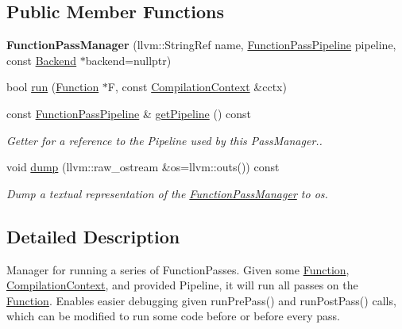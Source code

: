 \subsection*{Public Member Functions}
\begin{DoxyCompactItemize}
\item 
\mbox{\label{classglow_1_1_function_pass_manager_aacb987bbb3ae15f4afc84a4bcb23fb42}} 
{\bfseries Function\+Pass\+Manager} (llvm\+::\+String\+Ref name, \hyperlink{classglow_1_1_function_pass_pipeline}{Function\+Pass\+Pipeline} pipeline, const \hyperlink{classglow_1_1_backend}{Backend} $\ast$backend=nullptr)
\item 
bool \hyperlink{classglow_1_1_function_pass_manager_ac2c8fd23e1415a40177ec7e0cadd5930}{run} (\hyperlink{classglow_1_1_function}{Function} $\ast$F, const \hyperlink{structglow_1_1_compilation_context}{Compilation\+Context} \&cctx)
\item 
\mbox{\label{classglow_1_1_function_pass_manager_a8771d26bc6f66bf8163e1397d250d601}} 
const \hyperlink{classglow_1_1_function_pass_pipeline}{Function\+Pass\+Pipeline} \& \hyperlink{classglow_1_1_function_pass_manager_a8771d26bc6f66bf8163e1397d250d601}{get\+Pipeline} () const
\begin{DoxyCompactList}\small\item\em Getter for a reference to the Pipeline used by this Pass\+Manager.. \end{DoxyCompactList}\item 
\mbox{\label{classglow_1_1_function_pass_manager_ac0a103c6b97dce87a63020fb98f2049f}} 
void \hyperlink{classglow_1_1_function_pass_manager_ac0a103c6b97dce87a63020fb98f2049f}{dump} (llvm\+::raw\+\_\+ostream \&os=llvm\+::outs()) const
\begin{DoxyCompactList}\small\item\em Dump a textual representation of the \hyperlink{classglow_1_1_function_pass_manager}{Function\+Pass\+Manager} to {\ttfamily os}. \end{DoxyCompactList}\end{DoxyCompactItemize}


\subsection{Detailed Description}
Manager for running a series of Function\+Passes. Given some \hyperlink{classglow_1_1_function}{Function}, \hyperlink{structglow_1_1_compilation_context}{Compilation\+Context}, and provided Pipeline, it will run all passes on the \hyperlink{classglow_1_1_function}{Function}. Enables easier debugging given run\+Pre\+Pass() and run\+Post\+Pass() calls, which can be modified to run some code before or before every pass. 

